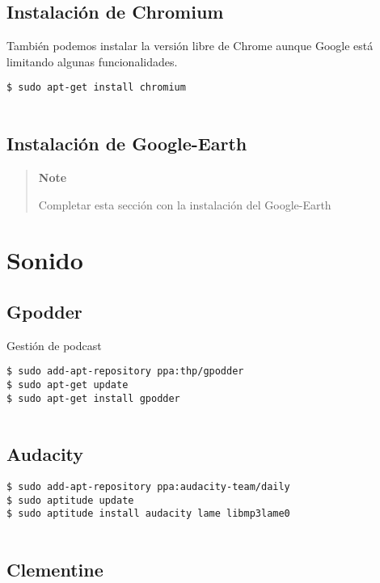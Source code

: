 \subsection{Instalación de Chromium}\label{instalaciuxf3n-de-chromium}

También podemos instalar la versión libre de Chrome aunque Google está
limitando algunas funcionalidades.

\begin{verbatim}
$ sudo apt-get install chromium
      
\end{verbatim}

\subsection{Instalación de
Google-Earth}\label{instalaciuxf3n-de-google-earth}

\begin{quote}
\textbf{Note}

Completar esta sección con la instalación del Google-Earth
\end{quote}

\section{Sonido}\label{sonido}

\subsection{Gpodder}\label{gpodder}

Gestión de podcast

\begin{verbatim}
$ sudo add-apt-repository ppa:thp/gpodder
$ sudo apt-get update
$ sudo apt-get install gpodder
      
\end{verbatim}

\subsection{Audacity}\label{audacity}

\begin{verbatim}
$ sudo add-apt-repository ppa:audacity-team/daily
$ sudo aptitude update
$ sudo aptitude install audacity lame libmp3lame0
      
\end{verbatim}

\subsection{Clementine}\label{clementine}

